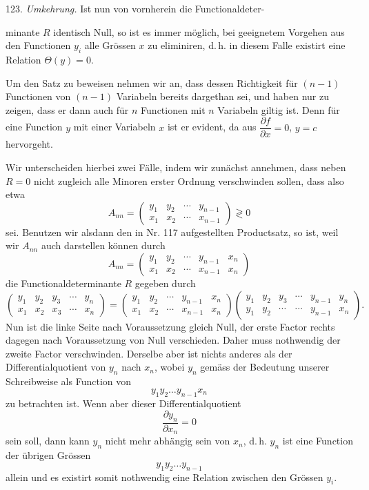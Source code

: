 123. \textit{Umkehrung.} Ist nun von vornherein die Functionaldeter-



minante $R$ identisch Null, so ist es immer möglich, bei geeignetem Vorgehen aus den Functionen $y_i$ alle Grössen $x$ zu eliminiren, d.\,h. in diesem Falle existirt eine Relation $\Theta(y) = 0$.

Um den Satz zu beweisen nehmen wir an, dass dessen Richtigkeit für $(n-1)$ Functionen von $(n-1)$ Variabeln bereits dargethan sei, und haben nur zu zeigen, dass er dann auch für $n$ Functionen mit $n$ Variabeln giltig ist. Denn für eine Function $y$ mit einer Variabeln $x$ ist er evident, da aus $\dfrac{\partial f}{\partial x} = 0$, $y = c$ hervorgeht.

Wir unterscheiden hierbei zwei Fälle, indem wir zunächst annehmen, dass neben $R = 0$ nicht zugleich alle Minoren erster Ordnung verschwinden sollen, dass also etwa
\[
A_{nn} = \begin{pmatrix} y_1 & y_2 & \cdots & y_{n-1} \\ x_1 & x_2 & \cdots & x_{n-1} \end{pmatrix} \gtrless 0
\]
sei. Benutzen wir alsdann den in Nr. 117 aufgestellten Productsatz, so ist, weil wir $A_{nn}$ auch darstellen können durch
\[
A_{nn} = \begin{pmatrix} y_1 & y_2 & \cdots & y_{n-1} & x_n \\ x_1 & x_2 & \cdots & x_{n-1} & x_n \end{pmatrix}
\]
die Functionaldeterminante $R$ gegeben durch
\[
\begin{pmatrix} y_1 & y_2 & y_3 & \cdots & y_n \\ x_1 & x_2 & x_3 & \cdots & x_n \end{pmatrix}
= \begin{pmatrix} y_1 & y_2 & \cdots & y_{n-1} & x_n \\ x_1 & x_2 & \cdots & x_{n-1} & x_n \end{pmatrix}
\begin{pmatrix} y_1 & y_2 & y_3 & \cdots & y_{n-1} & y_n \\ y_1 & y_2 & \cdots & \cdots & y_{n-1} & x_n \end{pmatrix}.
\]
Nun ist die linke Seite nach Voraussetzung gleich Null, der erste Factor rechts dagegen nach Voraussetzung von Null verschieden. Daher muss nothwendig der zweite Factor verschwinden. Derselbe aber ist nichts anderes als der Differentialquotient von $y_n$ nach $x_n$, wobei $y_n$ gemäss der Bedeutung unserer Schreibweise als Function von
\[
y_1 y_2 \ldots y_{n-1} x_n
\]
zu betrachten ist. Wenn aber dieser Differentialquotient
\[
\frac{\partial y_n}{\partial x_n} = 0
\]
sein soll, dann kann $y_n$ nicht mehr abhängig sein von $x_n$, d.\,h. $y_n$ ist eine Function der übrigen Grössen
\[
y_1 y_2 \ldots y_{n-1}
\]
allein und es existirt somit nothwendig eine Relation zwischen den Grössen $y_i$.


